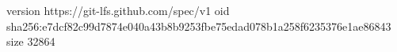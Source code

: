 version https://git-lfs.github.com/spec/v1
oid sha256:e7dcf82c99d7874e040a43b8b9253fbe75edad078b1a258f6235376e1ae86843
size 32864
